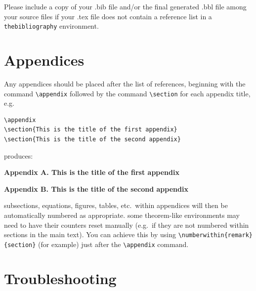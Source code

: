 \documentclass[]{interact}
\theoremstyle{plain}%
\theoremstyle{definition}
\theoremstyle{remark}
\begin{document}
Please include a copy of your .bib file and/or the final generated .bbl file among your source files if your .tex file does not contain a reference list in a \texttt{thebibliography} environment.


\section{Appendices}

Any appendices should be placed after the list of references, beginning with the command \verb"\appendix" followed by the command \verb"\section" for each appendix title, e.g.
\begin{verbatim}
\appendix
\section{This is the title of the first appendix}
\section{This is the title of the second appendix}
\end{verbatim}
produces:\medskip

\noindent\textbf{Appendix A. This is the title of the first appendix}\medskip

\noindent\textbf{Appendix B. This is the title of the second appendix}\medskip

\noindent subsections, equations, figures, tables, etc.\ within appendices will then be automatically numbered as appropriate. some theorem-like environments may need to have their counters reset manually (e.g.\ if they are not numbered within sections in the main text). You can achieve this by using \verb"\numberwithin{remark}{section}" (for example) just after the \verb"\appendix" command.


\appendix

\section{Troubleshooting}
\end{document}
